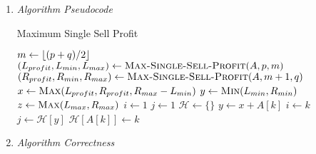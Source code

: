 \documentclass[10pt, letterpaper]{article}
\begin{document}
\begin{enumerate}[label={\bfseries Q\arabic*.}]
\begin{enumerate}
      \item
        {\itshape Algorithm Pseudocode}
        \vspace{-5mm}
        \begin{center}
          \begin{minipage}{\linewidth}
            \begin{algorithm}[H]
              \caption{Maximum Single Sell Profit}\label{alg:max-single-sell-profit}
              \begin{algorithmic}[1]
                 
                    \State {}
                  \EndIf
                  \State $m \gets \lfloor (p + q) / 2 \rfloor$
                  \State $(L_{profit}, L_{min}, L_{max}) \gets \textsc{Max-Single-Sell-Profit}(A, p, m)$
                  \State $(R_{profit}, R_{min}, R_{max}) \gets \textsc{Max-Single-Sell-Profit}(A, m + 1, q)$
                  \State $x \gets \textsc{Max}(L_{profit}, R_{profit}, R_{max} - L_{min})$
                  \State $y \gets \textsc{Min}(L_{min}, R_{min})$
                  \State $z \gets \textsc{Max}(L_{max}, R_{max})$
                  \State {}
                \EndProcedure
                \State
                 
                  \State $i \gets 1$
                  \State $j \gets 1$
                  \State $\mathcal{H} \gets \{\}$ 
                    \State $y \gets x + A[k]$
                      \State $i \gets k$
                      \State $j \gets \mathcal{H}[y]$
                      \State {} 
                    \EndIf
                    \State $\mathcal{H}\left[A[k]\right] \gets k$
                  \EndFor
                  \State {} 
                \EndProcedure
              \end{algorithmic}
            \end{algorithm}
          \end{minipage}
        \end{center}

      \item
        {\itshape Algorithm Correctness} \\ \vspace{-3mm}


\end{enumerate}
\end{enumerate}
\end{document}
